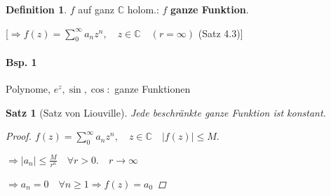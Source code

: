 \documentclass[ngerman,halfparskip]{scrartcl}
\newtheorem*{satz*}{Satz}
\theoremstyle{definition}
\newtheorem{defin}{Definition}[section]
\def\C{\mathbb C}
\begin{document}
\begin{defin}
$f$ auf ganz $\C $ holom.: $f$ \textbf{ganze Funktion}.

[$\Rightarrow f(z)=\sum\limits_0^\infty a_n z^n, \quad z\in\C \quad (r=\infty) $ (Satz 4.3)]
\end{defin}

\paragraph{Bsp. 1} Polynome, $e^z,\sin,\cos:$ ganze Funktionen

\begin{satz*}[Satz von Liouville]
Jede beschränkte ganze Funktion ist konstant.
\begin{proof}
$f(z)=\sum\limits_0^\infty a_n z^n, \quad z\in\C \quad |f(z)|\leq M.$

$\Rightarrow |a_n|\leq \frac M {r^n} \quad \forall r> 0. \quad r\rightarrow \infty $

$\Rightarrow a_n=0 \quad \forall n\geq 1 \Rightarrow f(z)=a_0$
\end{proof}
\end{satz*}
\end{document}
